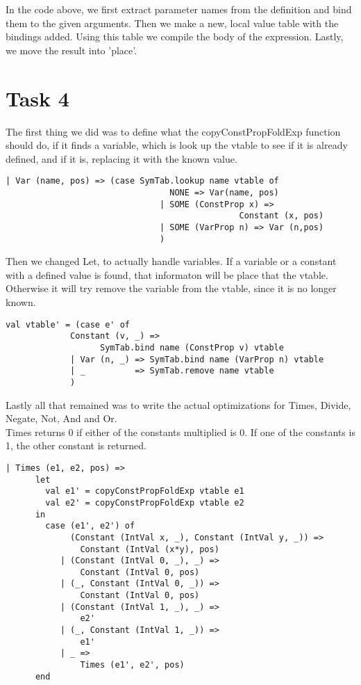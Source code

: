 \documentclass[10pt]{article}
\begin{document}
In the code above, we first extract parameter names from the definition and bind them to the given arguments. Then we make a new, local value table with the bindings added. Using this table we compile the body of the expression. Lastly, we move the result into 'place'.

\section{Task 4}
The first thing we did was to define what the copyConstPropFoldExp function should do, if it finds a variable, which is look up the vtable to see if it is already defined, and if it is, replacing it with the known value.
\begin{Verbatim}[frame=single]
      | Var (name, pos) => (case SymTab.lookup name vtable of
                                 NONE => Var(name, pos)
                               | SOME (ConstProp x) =>
                                               Constant (x, pos)
                               | SOME (VarProp n) => Var (n,pos)
                               )
\end{Verbatim}

Then we changed Let, to actually handle variables. If a variable or a constant with a defined value is found, that informaton will be place that the vtable. Otherwise it will try remove the variable from the vtable, since it is no longer known.
\begin{Verbatim}[frame=single]
     val vtable' = (case e' of
             Constant (v, _) =>
		           SymTab.bind name (ConstProp v) vtable
             | Var (n, _) => SymTab.bind name (VarProp n) vtable
             | _          => SymTab.remove name vtable
             )
\end{Verbatim}

Lastly all that remained was to write the actual optimizations for Times, Divide, Negate, Not, And and Or.\\

Times returns 0 if either of the constants multiplied is 0. If one of the constants is 1, the other constant is returned.
\begin{Verbatim}[frame=single]
    | Times (e1, e2, pos) =>
      let 
        val e1' = copyConstPropFoldExp vtable e1
        val e2' = copyConstPropFoldExp vtable e2
      in 
        case (e1', e2') of
             (Constant (IntVal x, _), Constant (IntVal y, _)) =>
               Constant (IntVal (x*y), pos)
           | (Constant (IntVal 0, _), _) =>
               Constant (IntVal 0, pos)
           | (_, Constant (IntVal 0, _)) =>
               Constant (IntVal 0, pos)
           | (Constant (IntVal 1, _), _) =>
               e2'
           | (_, Constant (IntVal 1, _)) =>
               e1'
           | _ =>
               Times (e1', e2', pos)
      end
\end{Verbatim}
\end{document}
